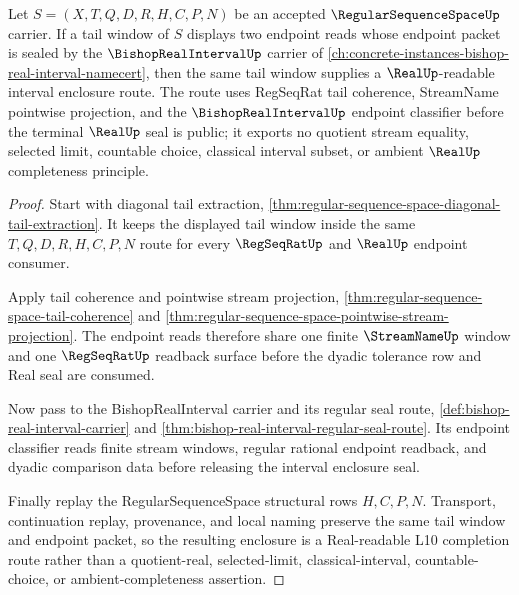 \begin{theorem}
\label{thm:regular-sequence-space-bishop-real-interval-route}
Let $S=(X,T,Q,D,R,H,C,P,N)$ be an accepted $\RegularSequenceSpaceUp$ carrier. If a tail window of $S$ displays two endpoint reads whose endpoint packet is sealed by the $\BishopRealIntervalUp$ carrier of \autoref{ch:concrete-instances-bishop-real-interval-namecert}, then the same tail window supplies a $\RealUp$-readable interval enclosure route. The route uses RegSeqRat tail coherence, StreamName pointwise projection, and the $\BishopRealIntervalUp$ endpoint classifier before the terminal $\RealUp$ seal is public; it exports no quotient stream equality, selected limit, countable choice, classical interval subset, or ambient $\RealUp$ completeness principle.
\end{theorem}
\begin{proof}
Start with diagonal tail extraction, \autoref{thm:regular-sequence-space-diagonal-tail-extraction}. It keeps the displayed tail window inside the same $T,Q,D,R,H,C,P,N$ route for every $\RegSeqRatUp$ and $\RealUp$ endpoint consumer.

Apply tail coherence and pointwise stream projection, \autoref{thm:regular-sequence-space-tail-coherence} and \autoref{thm:regular-sequence-space-pointwise-stream-projection}. The endpoint reads therefore share one finite $\StreamNameUp$ window and one $\RegSeqRatUp$ readback surface before the dyadic tolerance row and Real seal are consumed.

Now pass to the BishopRealInterval carrier and its regular seal route, \autoref{def:bishop-real-interval-carrier} and \autoref{thm:bishop-real-interval-regular-seal-route}. Its endpoint classifier reads finite stream windows, regular rational endpoint readback, and dyadic comparison data before releasing the interval enclosure seal.

Finally replay the RegularSequenceSpace structural rows $H,C,P,N$. Transport, continuation replay, provenance, and local naming preserve the same tail window and endpoint packet, so the resulting enclosure is a Real-readable L10 completion route rather than a quotient-real, selected-limit, classical-interval, countable-choice, or ambient-completeness assertion.
\end{proof}

